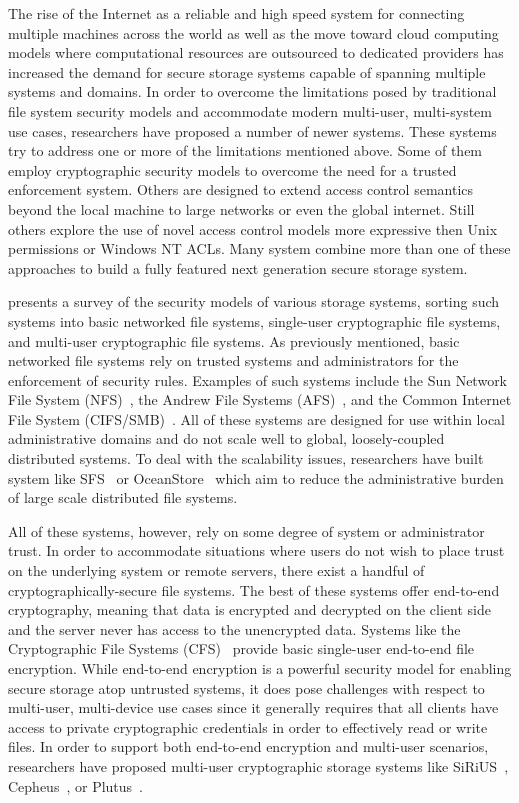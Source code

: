 The rise of the Internet as a reliable and high speed system for
connecting multiple machines across the world as well as the move
toward cloud computing models where computational resources are
outsourced to dedicated providers has increased the demand for secure
storage systems capable of spanning multiple systems and domains. In
order to overcome the limitations posed by traditional file system
security models and accommodate modern multi-user, multi-system use
cases, researchers have proposed a number of newer systems. These
systems try to address one or more of the limitations mentioned
above. Some of them employ cryptographic security models to overcome
the need for a trusted enforcement system. Others are designed to
extend access control semantics beyond the local machine to large
networks or even the global internet. Still others explore the use of
novel access control models more expressive then Unix permissions or
Windows NT ACLs. Many system combine more than one of these approaches
to build a fully featured next generation secure storage system.

\cite{Kher2005} presents a survey of the security models of various
storage systems, sorting such systems into basic networked file
systems, single-user cryptographic file systems, and multi-user
cryptographic file systems. As previously mentioned, basic networked
file systems rely on trusted systems and administrators for the
enforcement of security rules. Examples of such systems include the
Sun Network File System (NFS)~\cite{Sandberg1985}, the Andrew File
Systems (AFS)~\cite{Howard1988}, and the Common Internet File System
(CIFS/SMB)~\cite{microsoft-smb2}. All of these systems are designed
for use within local administrative domains and do not scale well to
global, loosely-coupled distributed systems. To deal with the
scalability issues, researchers have built system like
SFS~\cite{Mazieres1999} or OceanStore~\cite{Kubiatowicz2000} which aim
to reduce the administrative burden of large scale distributed file
systems.

All of these systems, however, rely on some degree of system or
administrator trust. In order to accommodate situations where users do
not wish to place trust on the underlying system or remote servers,
there exist a handful of cryptographically-secure file systems. The
best of these systems offer end-to-end cryptography, meaning that data
is encrypted and decrypted on the client side and the server never has
access to the unencrypted data.  Systems like the Cryptographic File
Systems (CFS)~\cite{Blaze1993} provide basic single-user end-to-end
file encryption. While end-to-end encryption is a powerful security
model for enabling secure storage atop untrusted systems, it does pose
challenges with respect to multi-user, multi-device use cases since it
generally requires that all clients have access to private
cryptographic credentials in order to effectively read or write
files. In order to support both end-to-end encryption and multi-user
scenarios, researchers have proposed multi-user cryptographic storage
systems like SiRiUS~\cite{Goh2003}, Cepheus~\cite{Fu1998}, or
Plutus~\cite{Kallahalla2003}.

